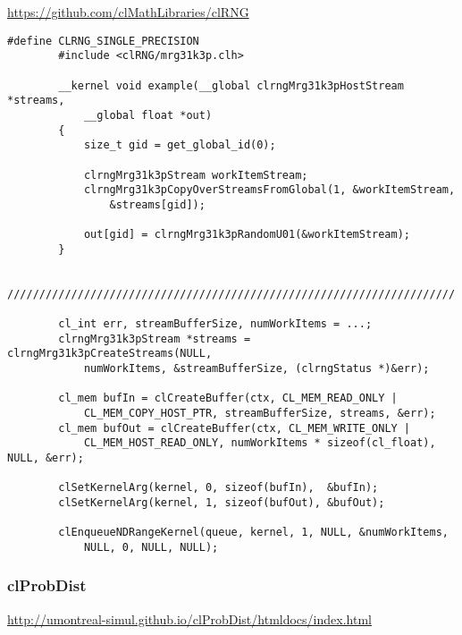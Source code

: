             \url{https://github.com/clMathLibraries/clRNG}			
            \begin{lstlisting}[caption=clRNG Beispiel]
        #define CLRNG_SINGLE_PRECISION                                  
        #include <clRNG/mrg31k3p.clh>                                  
                                                                
        __kernel void example(__global clrngMrg31k3pHostStream *streams, 
            __global float *out)
        {                                                               
            size_t gid = get_global_id(0);                                 
                                                                      
            clrngMrg31k3pStream workItemStream;                          
            clrngMrg31k3pCopyOverStreamsFromGlobal(1, &workItemStream, 
                &streams[gid]); 
                                                                   
            out[gid] = clrngMrg31k3pRandomU01(&workItemStream);       
        }                                                                                                                               
    
        //////////////////////////////////////////////////////////////////////
			
        cl_int err, streamBufferSize, numWorkItems = ...;
        clrngMrg31k3pStream *streams = clrngMrg31k3pCreateStreams(NULL, 
            numWorkItems, &streamBufferSize, (clrngStatus *)&err);

        cl_mem bufIn = clCreateBuffer(ctx, CL_MEM_READ_ONLY | 
            CL_MEM_COPY_HOST_PTR, streamBufferSize, streams, &err);
        cl_mem bufOut = clCreateBuffer(ctx, CL_MEM_WRITE_ONLY | 
            CL_MEM_HOST_READ_ONLY, numWorkItems * sizeof(cl_float), NULL, &err);
            
        clSetKernelArg(kernel, 0, sizeof(bufIn),  &bufIn);
        clSetKernelArg(kernel, 1, sizeof(bufOut), &bufOut);

        clEnqueueNDRangeKernel(queue, kernel, 1, NULL, &numWorkItems, 
            NULL, 0, NULL, NULL);
            \end{lstlisting}
			
            \subsubsection{clProbDist}
            \url{http://umontreal-simul.github.io/clProbDist/htmldocs/index.html}
			
